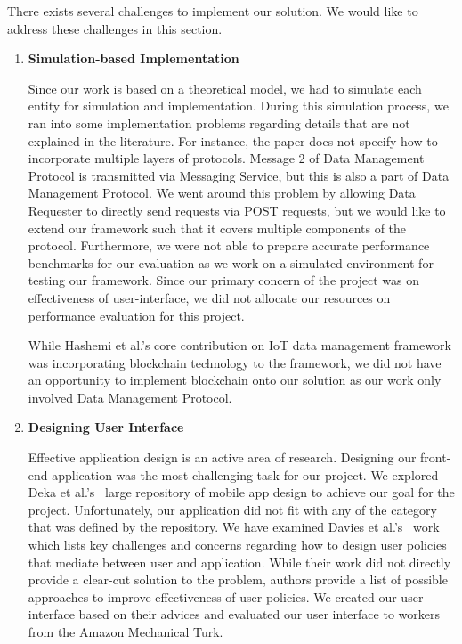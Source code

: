 There exists several challenges to implement our solution. We would like to address these challenges in this section. 

\begin{enumerate}
\item \textbf{Simulation-based Implementation}

Since our work is based on a theoretical model, we had to simulate each entity for simulation and implementation. During this simulation process, we ran into some implementation problems regarding details that are not explained in the literature. For instance, the paper does not specify how to incorporate multiple layers of protocols. Message 2 of Data Management Protocol is transmitted via Messaging Service, but this is also a part of Data Management Protocol. We went around this problem by allowing Data Requester to directly send requests via POST requests, but we would like to extend our framework such that it covers multiple components of the protocol. Furthermore, we were not able to prepare accurate performance benchmarks for our evaluation as we work on a simulated environment for testing our framework. Since our primary concern of the project was on effectiveness of user-interface, we did not allocate our resources on performance evaluation for this project.

While Hashemi et al.'s core contribution on IoT data management framework was incorporating blockchain technology to the framework, we did not have an opportunity to implement blockchain onto our solution as our work only involved Data Management Protocol.


\item \textbf{Designing User Interface}

Effective application design is an active area of research. Designing our front-end application was the most challenging task for our project. We explored Deka et al.'s~\cite{rico} large repository of mobile app design to achieve our goal for the project. Unfortunately, our application did not fit with any of the category that was defined by the repository. We have examined Davies et al.'s~\cite{davies} work which lists key challenges and concerns regarding how to design user policies that mediate between user and application. While their work did not directly provide a clear-cut solution to the problem, authors provide a list of possible approaches to improve effectiveness of user policies. We created our user interface based on their advices and evaluated our user interface to workers from the Amazon Mechanical Turk.


\end{enumerate}
